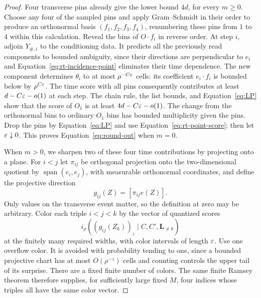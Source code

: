 \begin{proof}
Four transverse pins already give the lower bound $4d$, for every
$m\ge0$.  Choose any four of the sampled pins and apply Gram--Schmidt
in their order to produce an orthonormal basis $(f_1,f_2,f_3,f_4)$,
renumbering these pins from $1$ to $4$ within this calculation.
Reveal the bins of $O\cdot f_i$ in reverse order.  At step $i$,
adjoin $Y_{\#,i}$ to the conditioning data.  It predicts all the
previously read components to bounded ambiguity, since their
directions are perpendicular to $e_i$ and
Equation~\eqref{eq:rt-incidence-point} eliminates their time
dependence.  The new component determines $\theta_i$ to at most
$\rho^{-C\varepsilon}$ cells: its coefficient
$e_i\cdot f_i$ is bounded below by $\rho^{C\varepsilon}$.
The time score with all pins consequently contributes at least
$d-C\varepsilon-o(1)$ at each step.  The chain rule, the list bounds,
and Equation~\eqref{eq:LP} show that the score of $O_1$ is at
least $4d-C\varepsilon-o(1)$.  The change from the orthonormal bins
to ordinary $O_1$ bins has bounded multiplicity given the pins.
Drop the pins by Equation~\eqref{eq:LP} and use
Equation~\eqref{eq:rt-point-score}; then let $\varepsilon\downarrow0$.
This proves Equation~\eqref{eq:round-out} when $m=0$.

When $m>0$, we sharpen two of these four time contributions by
projecting onto a plane.  For $i<j$ let $\pi_{ij}$ be orthogonal
projection onto the two-dimensional quotient by
$\operatorname{span}(e_i,e_j)$, with measurable orthonormal
coordinates, and define the projective direction
\[
 g_{ij}(Z)=[\pi_{ij}e(Z)].
\]
Only values on the transverse event matter, so the definition at
zero may be arbitrary.  Color each triple $i<j<k$ by the vector
of quantized scores
\[
 i_\rho((g_{ij}(Z_k))_z\mid C,C',\mathbf L_{\ne k})
\]
at the finitely many required widths, with color intervals of
length $\varepsilon$.  Use one overflow color.  It is avoided with
probability tending to one, since a bounded projective chart has
at most $O(\rho^{-z})$ cells and counting controls the upper
tail of its surprise.  There are a fixed finite number of colors.
The same finite Ramsey theorem \cite[Theorem~B, p.~267]{Ramsey1930}
therefore supplies, for sufficiently large fixed $M$, four indices whose
triples all have the same color vector.


\end{proof}
